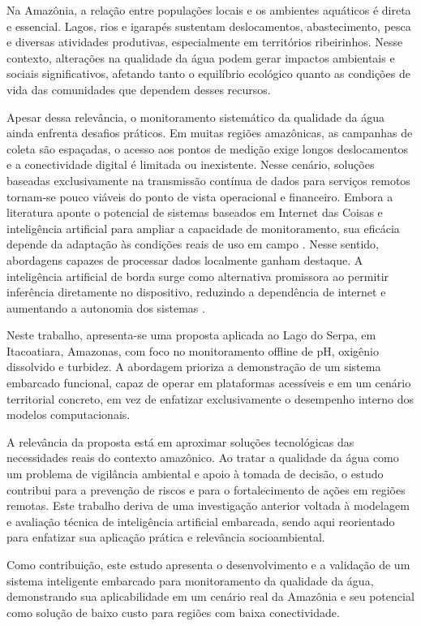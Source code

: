 
Na Amaz\^onia, a rela\c{c}\~ao entre popula\c{c}\~oes locais e os ambientes aqu\'aticos \'e direta e essencial. Lagos, rios e igarap\'es sustentam deslocamentos, abastecimento, pesca e diversas atividades produtivas, especialmente em territ\'orios ribeirinhos. Nesse contexto, altera\c{c}\~oes na qualidade da \'agua podem gerar impactos ambientais e sociais significativos, afetando tanto o equil\'ibrio ecol\'ogico quanto as condi\c{c}\~oes de vida das comunidades que dependem desses recursos.

Apesar dessa relev\^ancia, o monitoramento sistem\'atico da qualidade da \'agua ainda enfrenta desafios pr\'aticos. Em muitas regi\~oes amaz\^onicas, as campanhas de coleta s\~ao espa\c{c}adas, o acesso aos pontos de medi\c{c}\~ao exige longos deslocamentos e a conectividade digital \'e limitada ou inexistente. Nesse cen\'ario, solu\c{c}\~oes baseadas exclusivamente na transmiss\~ao cont\'inua de dados para servi\c{c}os remotos tornam-se pouco vi\'aveis do ponto de vista operacional e financeiro. Embora a literatura aponte o potencial de sistemas baseados em Internet das Coisas e intelig\^encia artificial para ampliar a capacidade de monitoramento, sua efic\'acia depende da adapta\c{c}\~ao \`as condi\c{c}\~oes reais de uso em campo \cite{zulkifli2022,rahu2023,lowe2022}. Nesse sentido, abordagens capazes de processar dados localmente ganham destaque. A intelig\^encia artificial de borda surge como alternativa promissora ao permitir infer\^encia diretamente no dispositivo, reduzindo a depend\^encia de internet e aumentando a autonomia dos sistemas \cite{aral2024}.

Neste trabalho, apresenta-se uma proposta aplicada ao Lago do Serpa, em Itacoatiara, Amazonas, com foco no monitoramento offline de pH, oxig\^enio dissolvido e turbidez. A abordagem prioriza a demonstra\c{c}\~ao de um sistema embarcado funcional, capaz de operar em plataformas acess\'iveis e em um cen\'ario territorial concreto, em vez de enfatizar exclusivamente o desempenho interno dos modelos computacionais.

A relev\^ancia da proposta est\'a em aproximar solu\c{c}\~oes tecnol\'ogicas das necessidades reais do contexto amaz\^onico. Ao tratar a qualidade da \'agua como um problema de vigil\^ancia ambiental e apoio \`a tomada de decis\~ao, o estudo contribui para a preven\c{c}\~ao de riscos e para o fortalecimento de a\c{c}\~oes em regi\~oes remotas. Este trabalho deriva de uma investiga\c{c}\~ao anterior voltada \`a modelagem e avalia\c{c}\~ao t\'ecnica de intelig\^encia artificial embarcada, sendo aqui reorientado para enfatizar sua aplica\c{c}\~ao pr\'atica e relev\^ancia socioambiental.

Como contribui\c{c}\~ao, este estudo apresenta o desenvolvimento e a valida\c{c}\~ao de um sistema inteligente embarcado para monitoramento da qualidade da \'agua, demonstrando sua aplicabilidade em um cen\'ario real da Amaz\^onia e seu potencial como solu\c{c}\~ao de baixo custo para regi\~oes com baixa conectividade.
